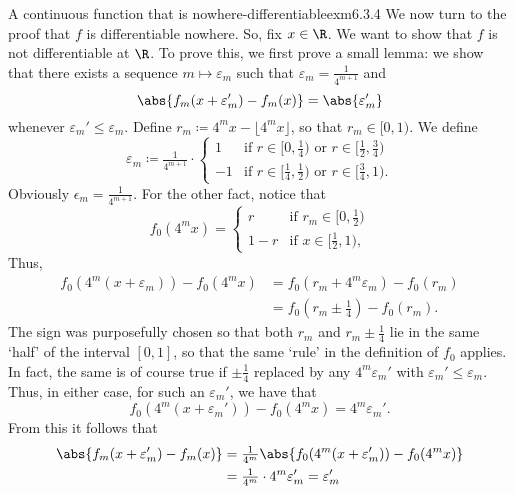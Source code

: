 \begin{exm}{A continuous function that is nowhere-differentiable}{exm6.3.4}
We now turn to the proof that $f$ is differentiable nowhere.  So, fix $x\in \R$.  We want to show that $f$ is not differentiable at $\R$.  To prove this, we first prove a small lemma:  we show that there exists a sequence $m\mapsto \varepsilon _m$ such that $\varepsilon _m=\frac{1}{4^{m+1}}$ and
\begin{equation}
\abs{f_m(x+\varepsilon _m')-f_m(x)}=\abs{\varepsilon _m'}
\end{equation}
whenever $\varepsilon _m'\leq \varepsilon _m$.  Define $r_m\coloneqq 4^mx-\lfloor 4^mx\rfloor$, so that $r_m\in [0,1)$.  We define
\begin{equation}
\varepsilon _m\coloneqq \tfrac{1}{4^{m+1}}\cdot \begin{cases}1 & \text{if }r\in [0,\tfrac{1}{4})\text{ or }r\in [\tfrac{1}{2},\tfrac{3}{4}) \\ -1 & \text{if }r\in [\tfrac{1}{4},\tfrac{1}{2})\text{ or }r\in [\tfrac{3}{4},1).\end{cases}
\end{equation}
Obviously $\epsilon _m=\frac{1}{4^{m+1}}$.  For the other fact, notice that
\begin{equation}
f_0(4^mx)=\begin{cases}r & \text{if }r_m\in [0,\tfrac{1}{2}) \\ 1-r & \text{if }x\in [\tfrac{1}{2},1),\end{cases}
\end{equation}
Thus,
\begin{equation}
\begin{split}
f_0(4^m(x+\varepsilon _m))-f_0(4^mx) & =f_0(r_m+4^m\varepsilon _m)-f_0(r_m) \\
& =f_0(r_m\pm \tfrac{1}{4})-f_0(r_m).
\end{split}
\end{equation}
The sign was purposefully chosen so that both $r_m$ and $r_m\pm \frac{1}{4}$ lie in the same `half' of the interval $[0,1]$, so that the same `rule' in the definition of $f_0$ applies.  In fact, the same is of course true if $\pm \tfrac{1}{4}$ replaced by any $4^m\varepsilon _m'$ with $\varepsilon _m'\leq \varepsilon _m$.  Thus, in either case, for such an $\varepsilon _m'$, we have that
\begin{equation}
f_0(4^m(x+\varepsilon _m'))-f_0(4^mx)=4^m\varepsilon _m'.
\end{equation}
From this it follows that
\begin{equation*}
\begin{split}
\abs{f_m(x+\varepsilon _m')-f_m(x)} & =\tfrac{1}{4^m}\abs{f_0(4^m(x+\varepsilon _m'))-f_0(4^mx)} \\
& =\tfrac{1}{4^m}\cdot 4^m\varepsilon _m'=\varepsilon _m'
\end{split}
\end{equation*}


\end{exm}
